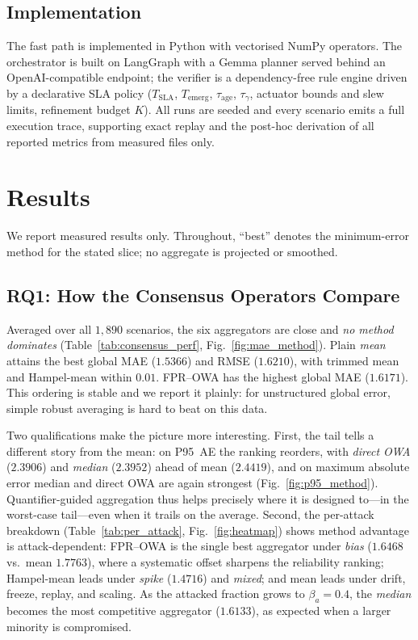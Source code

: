 \subsection{Implementation}
\label{sec:setup_impl}

The fast path is implemented in Python with vectorised NumPy operators.
The orchestrator is built on LangGraph with a Gemma planner served behind
an OpenAI-compatible endpoint; the verifier is a dependency-free rule
engine driven by a declarative SLA policy ($T_{\mathrm{SLA}}$,
$T_{\mathrm{emerg}}$, $\tau_{\mathrm{age}}$, $\tau_{\gamma}$, actuator
bounds and slew limits, refinement budget $K$). All runs are seeded and
every scenario emits a full execution trace, supporting exact replay and
the post-hoc derivation of all reported metrics from measured files
only.

\section{Results}
\label{sec:results}

We report measured results only. Throughout, ``best'' denotes the
minimum-error method for the stated slice; no aggregate is projected or
smoothed.

\subsection{RQ1: How the Consensus Operators Compare}
\label{sec:results_rq1}

Averaged over all $1{,}890$ scenarios, the six aggregators are close and
\emph{no method dominates} (Table~\ref{tab:consensus_perf},
Fig.~\ref{fig:mae_method}). Plain \emph{mean} attains the best global MAE
($1.5366$) and RMSE ($1.6210$), with trimmed mean and Hampel-mean within
$0.01$. FPR--OWA has the highest global MAE ($1.6171$). This ordering is
stable and we report it plainly: for unstructured global error, simple
robust averaging is hard to beat on this data.

Two qualifications make the picture more interesting. First, the tail
tells a different story from the mean: on P95~AE the ranking reorders,
with \emph{direct OWA} ($2.3906$) and \emph{median} ($2.3952$) ahead of
mean ($2.4419$), and on maximum absolute error median and direct OWA are
again strongest (Fig.~\ref{fig:p95_method}). Quantifier-guided
aggregation thus helps precisely where it is designed to---in the
worst-case tail---even when it trails on the average. Second, the
per-attack breakdown (Table~\ref{tab:per_attack},
Fig.~\ref{fig:heatmap}) shows method advantage is attack-dependent:
FPR--OWA is the single best aggregator under \emph{bias}
($1.6468$ vs.\ mean $1.7763$), where a systematic offset sharpens the
reliability ranking; Hampel-mean leads under \emph{spike} ($1.4716$) and
\emph{mixed}; and mean leads under drift, freeze, replay, and scaling.
As the attacked fraction grows to $\beta_a=0.4$, the \emph{median}
becomes the most competitive aggregator ($1.6133$), as expected when a
larger minority is compromised.

